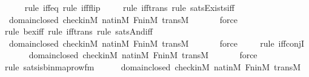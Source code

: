 \begin{isabellebody}
\ \ \ \ \isamarkupfalse%
{\isacharparenleft}{\kern0pt}rule\ iff{\isacharunderscore}{\kern0pt}eq{\isacharcomma}{\kern0pt}\ rule\ iff{\isacharunderscore}{\kern0pt}flip{\isacharparenright}{\kern0pt}\isanewline
\ \ \ \ \isamarkupfalse%
{\isacharparenleft}{\kern0pt}rule\ iff{\isacharunderscore}{\kern0pt}trans{\isacharcomma}{\kern0pt}\ rule\ sats{\isacharunderscore}{\kern0pt}Exists{\isacharunderscore}{\kern0pt}iff{\isacharparenright}{\kern0pt}\isanewline
\ \ \ \ \isamarkupfalse%
\ domain{\isacharunderscore}{\kern0pt}closed\ check{\isacharunderscore}{\kern0pt}in{\isacharunderscore}{\kern0pt}M\ nat{\isacharunderscore}{\kern0pt}in{\isacharunderscore}{\kern0pt}M\ Fn{\isacharunderscore}{\kern0pt}in{\isacharunderscore}{\kern0pt}M\ transM\isanewline
\ \ \ \ \ \isamarkupfalse%
\ force\isanewline
\ \ \ \ \isamarkupfalse%
{\isacharparenleft}{\kern0pt}rule\ bex{\isacharunderscore}{\kern0pt}iff{\isacharcomma}{\kern0pt}\ rule\ iff{\isacharunderscore}{\kern0pt}trans{\isacharcomma}{\kern0pt}\ rule\ sats{\isacharunderscore}{\kern0pt}And{\isacharunderscore}{\kern0pt}iff{\isacharparenright}{\kern0pt}\isanewline
\ \ \ \ \isamarkupfalse%
\ domain{\isacharunderscore}{\kern0pt}closed\ check{\isacharunderscore}{\kern0pt}in{\isacharunderscore}{\kern0pt}M\ nat{\isacharunderscore}{\kern0pt}in{\isacharunderscore}{\kern0pt}M\ Fn{\isacharunderscore}{\kern0pt}in{\isacharunderscore}{\kern0pt}M\ transM\isanewline
\ \ \ \ \ \isamarkupfalse%
\ force\isanewline
\ \ \ \ \isamarkupfalse%
{\isacharparenleft}{\kern0pt}rule\ iff{\isacharunderscore}{\kern0pt}conjI{}{\isacharparenright}{\kern0pt}\isanewline
\ \ \ \ \isamarkupfalse%
\ domain{\isacharunderscore}{\kern0pt}closed\ check{\isacharunderscore}{\kern0pt}in{\isacharunderscore}{\kern0pt}M\ nat{\isacharunderscore}{\kern0pt}in{\isacharunderscore}{\kern0pt}M\ Fn{\isacharunderscore}{\kern0pt}in{\isacharunderscore}{\kern0pt}M\ transM\isanewline
\ \ \ \ \ \isamarkupfalse%
\ force\isanewline
\ \ \ \ \isamarkupfalse%
{\isacharparenleft}{\kern0pt}rule\ sats{\isacharunderscore}{\kern0pt}is{\isacharunderscore}{\kern0pt}binmap{\isacharunderscore}{\kern0pt}row{\isacharprime}{\kern0pt}{\isacharunderscore}{\kern0pt}fm{\isacharparenright}{\kern0pt}\isanewline
\ \ \ \ \isamarkupfalse%
\ domain{\isacharunderscore}{\kern0pt}closed\ check{\isacharunderscore}{\kern0pt}in{\isacharunderscore}{\kern0pt}M\ nat{\isacharunderscore}{\kern0pt}in{\isacharunderscore}{\kern0pt}M\ Fn{\isacharunderscore}{\kern0pt}in{\isacharunderscore}{\kern0pt}M\ transM\isanewline

\end{isabellebody}
